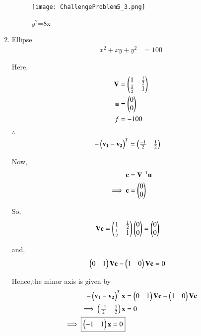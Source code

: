 \documentclass[journal,12pt,twocolumn]{IEEEtran}
\begin{document}
\begin{enumerate}
    \begin{figure}[!ht]
    \centering
    \texttt{[image: ChallengeProblem5\_3.png]}
    \caption{$y^2$=8x}
    \label{ex3}	
    \end{figure}
    
    \item Ellipse
    \begin{align}
        x^2+xy+y^2 &= 100
    \end{align}
    
    Here,
    \begin{align}
    \mathbf{V} &= \begin{pmatrix}1 & \frac{1}{2} \\ \frac{1}{2} & 1\end{pmatrix} \\
    \mathbf{u} &= \begin{pmatrix}0 \\ 0\end{pmatrix} \\
    f &= -100
    \end{align}

    $\therefore$
    \begin{align}
    -\begin{pmatrix}\mathbf{v_1}-\mathbf{v_2}\end{pmatrix}^T &= \begin{pmatrix}\frac{-1}{2} & \frac{1}{2}\end{pmatrix}
    \end{align}

    Now,
    \begin{align}
    \mathbf{c} &= \mathbf{V}^{-1}\mathbf{u}\\
    \implies \mathbf{c} &= \begin{pmatrix}0 \\ 0\end{pmatrix}
    \end{align}

    So,
    \begin{align}
    \mathbf{V}\mathbf{c} &= \begin{pmatrix}1 & \frac{1}{2} \\ \frac{1}{2} & 1\end{pmatrix}\begin{pmatrix}0 \\ 0\end{pmatrix}=\begin{pmatrix}0 \\ 0\end{pmatrix}
    \end{align}

    and,
    \begin{align}
    \begin{pmatrix}0 & 1\end{pmatrix}\mathbf{V}\mathbf{c} - \begin{pmatrix}1&0\end{pmatrix}\mathbf{V}\mathbf{c} &= 0
    \end{align}

    Hence,the minor axis is given by
    \begin{align}
    -\begin{pmatrix}\mathbf{v_1}-\mathbf{v_2}\end{pmatrix}^T\mathbf{x} &= \begin{pmatrix}0 & 1\end{pmatrix}\mathbf{V}\mathbf{c} - \begin{pmatrix}1 & 0\end{pmatrix}\mathbf{V}\mathbf{c} \\
    \implies \begin{pmatrix}\frac{-1}{2} & \frac{1}{2}\end{pmatrix}\mathbf{x} &= 0 \\
    \implies \boxed{\begin{pmatrix}-1 & 1\end{pmatrix}\mathbf{x} = 0}
    \end{align}
    

\end{enumerate}
\end{document}
